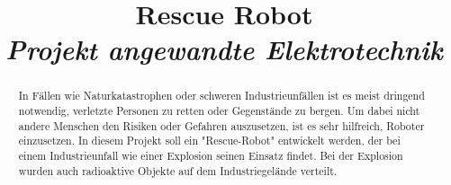 \documentclass[conference,compsoc]{IEEEtran}
\begin{document}
%
\title{Rescue Robot\\ \textit{Projekt angewandte Elektrotechnik}}


\author{
\and
{}
\and
{}
}


\maketitle

\begin{abstract}
In Fällen wie Naturkatastrophen oder schweren Industrieunfällen ist es meist dringend notwendig, verletzte Personen zu retten oder Gegenstände zu bergen. Um dabei nicht andere Menschen den Risiken oder Gefahren auszusetzen, ist es sehr hilfreich, Roboter einzusetzen. In diesem Projekt soll ein "Rescue-Robot" entwickelt werden, der bei einem Industrieunfall wie einer Explosion seinen Einsatz findet. Bei der Explosion wurden auch radioaktive Objekte auf dem Industriegelände verteilt.
\end{abstract}
\end{document}
